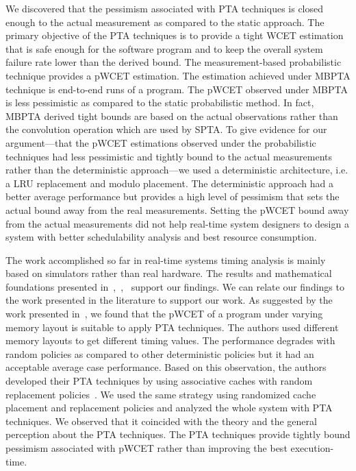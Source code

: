     
    
    
    
We discovered that the pessimism associated with PTA techniques is closed enough to the actual measurement as compared to the static approach. The primary objective of the PTA techniques is to provide a tight WCET estimation that is safe enough for the software program and to keep the overall system failure rate lower than the derived bound. The measurement-based probabilistic technique provides a pWCET estimation. The estimation achieved under MBPTA technique is end-to-end runs of a program. The pWCET observed under MBPTA is less pessimistic as compared to the static probabilistic method. In fact, MBPTA derived tight bounds are based on the actual observations rather than the convolution operation which are used by SPTA. To give evidence for our argument---that the pWCET estimations observed under the probabilistic techniques had less pessimistic and tightly bound to the actual measurements rather than the deterministic approach---we used a deterministic architecture, i.e. a LRU replacement and modulo placement. The deterministic approach had a better average performance but provides a high level of pessimism that sets the actual bound away from the real measurements. Setting the pWCET bound away from the actual measurements did not help real-time system designers to design a system with better schedulability analysis and best resource consumption. 
 
 
    
    
The work accomplished so far in real-time systems timing analysis  is mainly based on simulators rather than real hardware. The results and mathematical foundations presented in~\cite{kosmidis2014measurement},~\cite{abella2014comparison},~\cite{Kosmidis:2013:CDP:2485288.2485416} support our findings. We can relate our findings to the work presented in the literature to support our work. As suggested by the work presented in~\cite{quinones2009using}, we found that the pWCET of a program under varying memory layout is suitable to apply PTA techniques. The authors used different memory layouts to get different timing values. The performance degrades with random policies as compared to other deterministic policies but it had an acceptable average case performance. Based on this observation, the authors developed their PTA techniques by using associative caches with random replacement policies~\cite{Kosmidis:2013:CDP:2485288.2485416}. We used the same strategy using randomized cache placement and replacement policies and analyzed the whole system with PTA techniques. We observed  that it coincided with the theory and the general perception about the PTA techniques. The PTA techniques provide tightly bound pessimism associated with pWCET rather than improving the best execution-time. 
    
